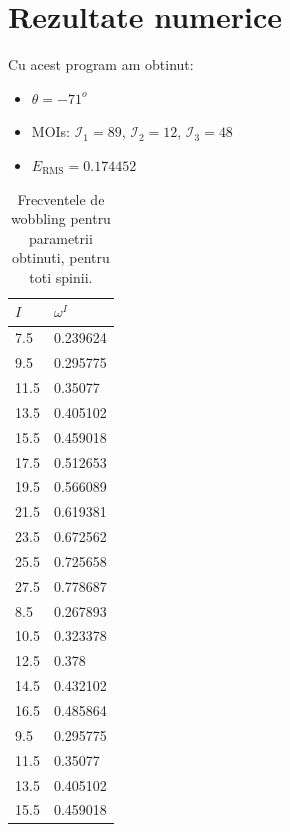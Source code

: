\documentclass[12pt]{article}
\begin{document}
\section{Rezultate numerice}
Cu acest program am obtinut:
\begin{itemize}
    \item $\theta=-71^o$
    \item MOIs: $\mathcal{I}_1=89$, $\mathcal{I}_2=12$, $\mathcal{I}_3=48$
    \item $E_\text{RMS}=0.174452$
\end{itemize}
\begin{table}[h]
    \centering
    \begin{tabular}{ll}
    \hline
    \multicolumn{1}{|l|}{$I$} & \multicolumn{1}{l|}{$\omega^I$} \\ \hline
    \multicolumn{1}{|l}{7.5}  & \multicolumn{1}{l|}{0.239624} \\
    9.5                       & 0.295775                      \\
    11.5                      & 0.35077                       \\
    13.5                      & 0.405102                      \\
    15.5                      & 0.459018                      \\
    17.5                      & 0.512653                      \\
    19.5                      & 0.566089                      \\
    21.5                      & 0.619381                      \\
    23.5                      & 0.672562                      \\
    25.5                      & 0.725658                      \\
    27.5                      & 0.778687                      \\
    8.5                       & 0.267893                      \\
    10.5                      & 0.323378                      \\
    12.5                      & 0.378                         \\
    14.5                      & 0.432102                      \\
    16.5                      & 0.485864                      \\
    9.5                       & 0.295775                      \\
    11.5                      & 0.35077                       \\
    13.5                      & 0.405102                      \\
    15.5                      & 0.459018                      \\ \hline
    \end{tabular}
    \caption{Frecventele de wobbling pentru parametrii obtinuti, pentru toti spinii.}
    \end{table}
\end{document}
